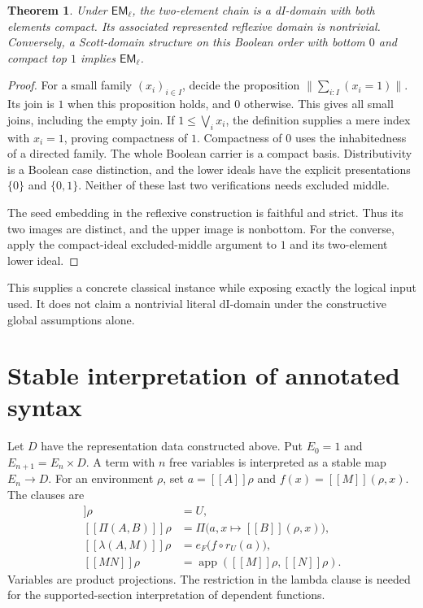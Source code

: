 \documentclass[11pt]{article}
\newtheorem{theorem}{Theorem}[section]
\newcommand{\llbracket}{[\![}
\newcommand{\rrbracket}{]\!]}
\begin{document}
\begin{theorem}
Under $\mathsf{EM}_{\ell}$, the two-element chain is a dI-domain with
both elements compact. Its associated represented reflexive domain is
nontrivial. Conversely, a Scott-domain structure on this Boolean order
with bottom $0$ and compact top $1$ implies $\mathsf{EM}_{\ell}$.
\end{theorem}
\begin{proof}
For a small family $(x_i)_{i\in I}$, decide the proposition
$\|\sum_{i:I}(x_i=1)\|$. Its join is $1$ when this proposition holds,
and $0$ otherwise. This gives all small joins, including the empty join.
If $1\le\bigvee_i x_i$, the definition supplies a mere index with
$x_i=1$, proving compactness of $1$. Compactness of $0$ uses the
inhabitedness of a directed family. The whole Boolean carrier is a
compact basis. Distributivity is a Boolean case distinction, and the
lower ideals have the explicit presentations $\{0\}$ and $\{0,1\}$.
Neither of these last two verifications needs excluded middle.

The seed embedding in the reflexive construction is faithful and
strict. Thus its two images are distinct, and the upper image is
nonbottom. For the converse, apply the compact-ideal excluded-middle
argument to $1$ and its two-element lower ideal.
\end{proof}

This supplies a concrete classical instance while exposing exactly the
logical input used. It does not claim a nontrivial literal dI-domain
under the constructive global assumptions alone.

\section{Stable interpretation of annotated syntax}

Let $D$ have the representation data constructed above. Put
$E_0=1$ and $E_{n+1}=E_n\times D$. A term with $n$ free variables is
interpreted as a stable map $E_n\to D$. For an environment $\rho$, set
$a=\llbracket A\rrbracket\rho$ and
$f(x)=\llbracket M\rrbracket(\rho,x)$. The clauses are
\begin{align*}
 \llbracket U\rrbracket\rho&=U,\\
 \llbracket\Pi(A,B)\rrbracket\rho
   &=\Pi\bigl(a,x\mapsto\llbracket B\rrbracket(\rho,x)\bigr),\\
 \llbracket\lambda(A,M)\rrbracket\rho
   &=e_F\bigl(f\circ r_U(a)\bigr),\\
 \llbracket MN\rrbracket\rho
   &=\operatorname{app}(\llbracket M\rrbracket\rho,
                          \llbracket N\rrbracket\rho).
\end{align*}
Variables are product projections. The restriction in the lambda clause
is needed for the supported-section interpretation of dependent functions.
\end{document}
